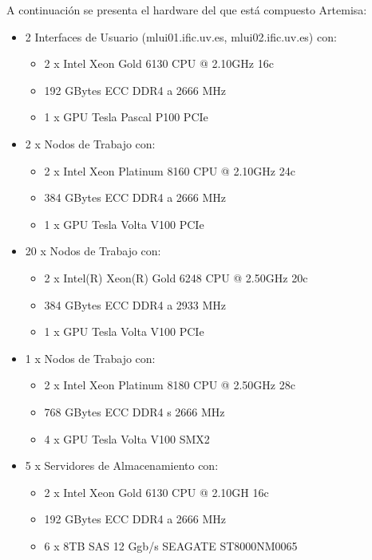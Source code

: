 A continuación se presenta el hardware del que está compuesto Artemisa:

\begin{itemize}
    \item 2 Interfaces de Usuario (mlui01.ific.uv.es, mlui02.ific.uv.es) con:
    \begin{itemize}
        \item 2 x Intel Xeon Gold 6130 CPU @ 2.10GHz 16c
        \item 192 GBytes ECC DDR4 a 2666 MHz
        \item 1 x GPU Tesla Pascal P100 PCIe
    \end{itemize}
    \item 2 x Nodos de Trabajo con:
    \begin{itemize}
        \item 2 x Intel Xeon Platinum 8160 CPU @ 2.10GHz 24c
        \item 384 GBytes ECC DDR4 a 2666 MHz
        \item 1 x GPU Tesla Volta V100 PCIe
    \end{itemize}
    \item 20 x Nodos de Trabajo con:
    \begin{itemize}
        \item 2 x Intel(R) Xeon(R) Gold 6248 CPU @ 2.50GHz 20c
        \item 384 GBytes ECC DDR4 a 2933 MHz
        \item 1 x GPU Tesla Volta V100 PCIe
    \end{itemize}
    \item 1 x Nodos de Trabajo con:
    \begin{itemize}
        \item 2 x Intel Xeon Platinum 8180 CPU @ 2.50GHz 28c
        \item 768 GBytes ECC DDR4 s 2666 MHz
        \item 4 x GPU Tesla Volta V100 SMX2
    \end{itemize}
    \item 5 x Servidores de Almacenamiento con:
    \begin{itemize}
        \item 2 x Intel Xeon Gold 6130 CPU @ 2.10GH 16c
        \item 192 GBytes ECC DDR4 a 2666 MHz
        \item 6 x 8TB SAS 12 Ggb/s SEAGATE ST8000NM0065
    \end{itemize}
\end{itemize}

